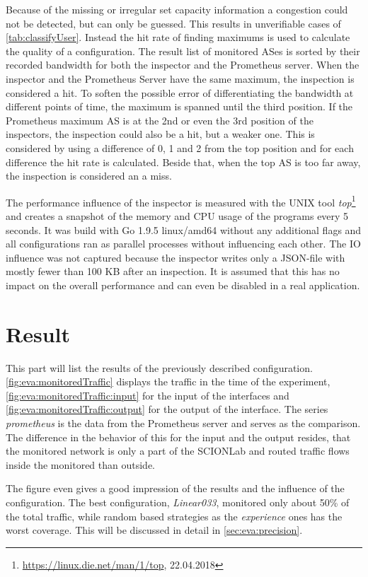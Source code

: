 \documentclass[thesis.tex]{subfiles}
\begin{document}
Because of the missing or irregular set capacity information a congestion could not be detected, but can only be guessed. This results in unverifiable cases of \autoref{tab:classifyUser}. Instead the hit rate of finding maximums is used to calculate the quality of a configuration. The result list of monitored ASes is sorted by their recorded bandwidth for both the inspector and the Prometheus server. When the inspector and the Prometheus Server have the same maximum, the inspection is considered a hit. To soften the possible error of differentiating the bandwidth at different points of time, the maximum is spanned until the third position. If the Prometheus maximum AS is at the 2nd or even the 3rd position of the inspectors, the inspection could also be a hit, but a weaker one. This is considered by using a difference of 0, 1 and 2 from the top position and for each difference the hit rate is calculated. Beside that, when the top AS is too far away, the inspection is considered an a miss.

The performance influence of the inspector is measured with the UNIX tool \textit{top}\footnote{\url{https://linux.die.net/man/1/top}, 22.04.2018} and creates a snapshot of the memory and CPU usage of the programs every 5 seconds. It was build with Go 1.9.5 linux/amd64 without any additional flags and all configurations ran as parallel processes without influencing each other. The IO influence was not captured because the inspector writes only a JSON-file with mostly fewer than 100 KB after an inspection. It is assumed that this has no impact on the overall performance and can even be disabled in a real application.

\section{Result}
This part will list the results of the previously described configuration. \autoref{fig:eva:monitoredTraffic} displays the traffic in the time of the experiment, \autoref{fig:eva:monitoredTraffic:input} for the input of the interfaces and \autoref{fig:eva:monitoredTraffic:output} for the output of the interface. The series \textit{prometheus} is the data from the Prometheus server and serves as the comparison. The difference in the behavior of this for the input and the output resides, that the monitored network is only a part of the SCIONLab and routed traffic flows inside the monitored than outside.

The figure even gives a good impression of the results and the influence of the configuration. The best configuration, \textit{Linear033}, monitored only about 50\% of the total traffic, while random based strategies as the \textit{experience} ones has the worst coverage. This will be discussed in detail in \autoref{sec:eva:precision}.
\end{document}
